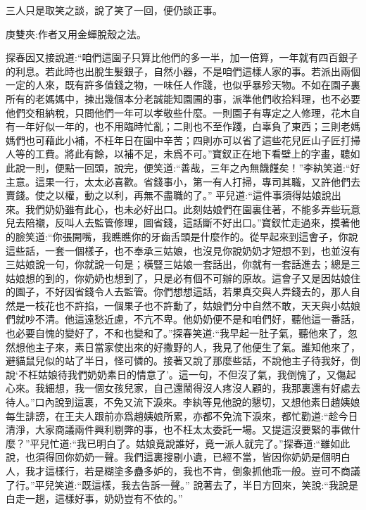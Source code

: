 \begin{parag}
    三人只是取笑之談，說了笑了一回，便仍談正事。\begin{note}庚雙夾:作者又用金蟬脫殼之法。\end{note}探春因又接說道:“咱們這園子只算比他們的多一半，加一倍算，一年就有四百銀子的利息。若此時也出脫生髮銀子，自然小器，不是咱們這樣人家的事。若派出兩個一定的人來，既有許多值錢之物，一味任人作踐，也似乎暴殄天物。不如在園子裏所有的老媽媽中，揀出幾個本分老誠能知園圃的事，派準他們收拾料理，也不必要他們交租納稅，只問他們一年可以孝敬些什麼。一則園子有專定之人修理，花木自有一年好似一年的，也不用臨時忙亂；二則也不至作踐，白辜負了東西；三則老媽媽們也可藉此小補，不枉年日在園中辛苦；四則亦可以省了這些花兒匠山子匠打掃人等的工費。將此有餘，以補不足，未爲不可。”寶釵正在地下看壁上的字畫，聽如此說一則，便點一回頭，說完，便笑道:“善哉，三年之內無饑饉矣！”李紈笑道:“好主意。這果一行，太太必喜歡。省錢事小，第一有人打掃，專司其職，又許他們去賣錢。使之以權，動之以利，再無不盡職的了。” 平兒道:“這件事須得姑娘說出來。我們奶奶雖有此心，也未必好出口。此刻姑娘們在園裏住著，不能多弄些玩意兒去陪襯，反叫人去監管修理，圖省錢，這話斷不好出口。”寶釵忙走過來，摸著他的臉笑道:“你張開嘴，我瞧瞧你的牙齒舌頭是什麼作的。從早起來到這會子，你說這些話，一套一個樣子，也不奉承三姑娘，也沒見你說奶奶才短想不到，也並沒有三姑娘說一句，你就說一句是；橫豎三姑娘一套話出，你就有一套話進去；總是三姑娘想的到的，你奶奶也想到了，只是必有個不可辦的原故。這會子又是因姑娘住的園子，不好因省錢令人去監管。你們想想這話，若果真交與人弄錢去的，那人自然是一枝花也不許掐，一個果子也不許動了，姑娘們分中自然不敢，天天與小姑娘們就吵不清。他這遠愁近慮，不亢不卑。他奶奶便不是和咱們好，聽他這一番話，也必要自愧的變好了，不和也變和了。”探春笑道:“我早起一肚子氣，聽他來了，忽然想他主子來，素日當家使出來的好撒野的人，我見了他便生了氣。誰知他來了，避貓鼠兒似的站了半日，怪可憐的。接著又說了那麼些話，不說他主子待我好，倒說‘不枉姑娘待我們奶奶素日的情意了’。這一句，不但沒了氣，我倒愧了，又傷起心來。我細想，我一個女孩兒家，自己還鬧得沒人疼沒人顧的，我那裏還有好處去待人。”口內說到這裏，不免又流下淚來。李紈等見他說的懇切，又想他素日趙姨娘每生誹謗，在王夫人跟前亦爲趙姨娘所累，亦都不免流下淚來，都忙勸道:“趁今日清淨，大家商議兩件興利剔弊的事，也不枉太太委託一場。又提這沒要緊的事做什麼？”平兒忙道:“我已明白了。姑娘竟說誰好，竟一派人就完了。”探春道:“雖如此說，也須得回你奶奶一聲。我們這裏搜剔小遺，已經不當，皆因你奶奶是個明白人，我才這樣行，若是糊塗多蠱多妒的，我也不肯，倒象抓他乖一般。豈可不商議了行。”平兒笑道:“既這樣，我去告訴一聲。” 說著去了，半日方回來，笑說:“我說是白走一趟，這樣好事，奶奶豈有不依的。”
\end{parag}


